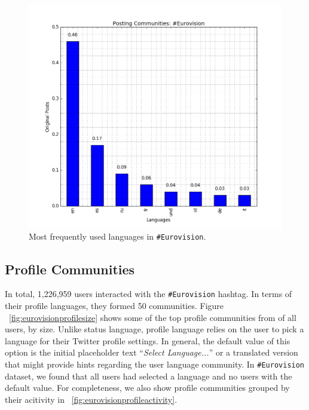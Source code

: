 \begin{figure}[htb]
\centering
\includegraphics[width=\columnwidth]{images/eurovision_langfreq.png}
\caption{Most frequently used languages in {\texttt{\#Eurovision}}.}
\label{fig:eurovisionlangfreq}
\end{figure}

\subsection{Profile Communities}\label{ppcomm}


In total, 1,226,959 users interacted with the {\texttt{\#Eurovision}}
hashtag. In terms of their profile languages, they formed 50
communities. Figure ~\ref{fig:eurovisionprofilesize} shows some of the top profile communities
from of all users, by size. Unlike status language, profile
language relies on the user to pick a language for their Twitter
profile settings. In general, the default value of this option is the
initial placeholder text ``{\emph{Select Language...}}'' or a
translated version that might provide hints regarding the user
language community. In  {\texttt{\#Eurovision}} dataset, we found that 
all users had selected a language and no users with the default value.
For completeness, we also show profile communities grouped by their acitivity 
in ~\ref{fig:eurovisionprofileactivity}.

